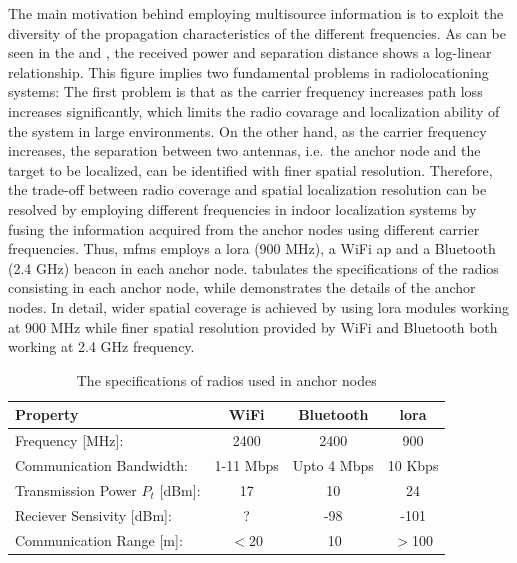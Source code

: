     The main motivation behind employing multisource information is to exploit the diversity of the propagation characteristics of the different frequencies.
    As can be seen in the  and , the received power and separation distance shows a log-linear relationship.
    This figure implies two fundamental problems in radiolocationing systems:
    The first problem is that as the carrier frequency increases path loss increases significantly, which limits the radio covarage and localization ability of the system in large environments.
    On the other hand, as the carrier frequency increases, the separation between two antennas, i.e.\ the anchor node and the target to be localized, can be identified with finer spatial resolution.
    Therefore, the trade-off between radio coverage and spatial localization resolution can be resolved by employing different frequencies in indoor localization systems by fusing the information acquired from the anchor nodes using different carrier frequencies.
    Thus, \gls{mfms} employs a \gls{lora} (900 MHz), a WiFi \gls{ap} and a Bluetooth (2.4 GHz) beacon in each anchor node.
     tabulates the specifications of the radios consisting in each anchor node, while  demonstrates the details of the anchor nodes.
    In detail, wider spatial coverage is achieved by using \gls{lora} modules working at 900 MHz while finer spatial resolution provided by WiFi and Bluetooth both working at 2.4 GHz frequency.

    \begin{table}
    \begin{center}
    \caption{\label{tab:specs}The specifications of radios used in anchor nodes}
      \begin{tabular}{@{}lccc@{}}\toprule[1.5pt]
        Property                        &WiFi           &Bluetooth      &\gls{lora}\\ \midrule[1.5pt]
        Frequency [MHz]:                &2400           &2400           &900 \\ \midrule
        Communication Bandwidth:        &1-11 Mbps      &Upto 4 Mbps    &10 Kbps \\ \midrule
        Transmission Power $P_t$ [dBm]: &17             &10             &24 \\ \midrule
        Reciever Sensivity [dBm]:       &?              &-98            &-101 \\ \midrule
        Communication Range [m]:        &$<$20          &$~$10            &$>$100  \\\bottomrule[1.5pt]
      \end{tabular}
    \end{center}
    \end{table}

